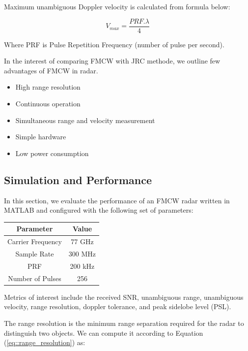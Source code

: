 \documentclass[conference]{IEEEtran}
\begin{document}
Maximum unambiguous Doppler velocity is calculated from formula below:

\begin{equation}
		V_{max} = \frac{PRF.\lambda}{4}
		\label{eq:: Doppler ambiguity_calculation}
	\end{equation}
  
  Where PRF is Pulse Repetition Frequency (number of pulse per second).

In the interest of comparing FMCW with JRC methode, we outline few advantages of FMCW in radar.
	\begin{itemize}
		\item High range resolution
		\item Continuous operation
		\item Simultaneous range and velocity measurement
		\item Simple hardware
		\item Low power consumption
	\end{itemize}
	



	\subsection {Simulation and Performance}

In this section, we evaluate the performance of an FMCW radar written in MATLAB and configured with the following set of parameters:

	\begin{center}
	\begin{tabular}{|c|c|}
		\hline
		Parameter & Value \\
		\hline
		Carrier Frequency & 77 GHz \\
		\hline
		Sample Rate & 300 MHz \\
		\hline
		PRF & 200 kHz \\
		\hline
		Number of Pulses & 256 \\
		\hline	
	\end{tabular}
	\end{center}
	
	Metrics of interest include the received SNR, unambiguous range, unambiguous velocity, range resolution, doppler tolerance, and peak sidelobe level (PSL).

	The range resolution is the minimum range separation required for the radar to distinguish two objects. We can compute it according to Equation (\ref{eq::range_resolution}) as:
	
\end{document}
